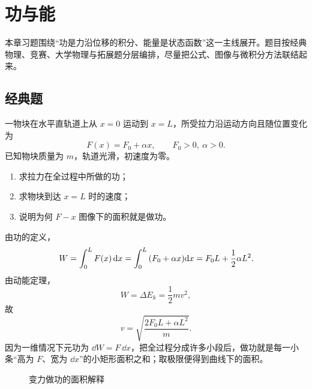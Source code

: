 \chapter{功与能}

本章习题围绕“功是力沿位移的积分、能量是状态函数”这一主线展开。题目按经典物理、竞赛、大学物理与拓展题分层编排，尽量把公式、图像与微积分方法联结起来。

\section{经典题}

\begin{classic}
一物块在水平直轨道上从 $x=0$ 运动到 $x=L$，所受拉力沿运动方向且随位置变化为
\[
F(x)=F_0+\alpha x,\qquad F_0>0,\ \alpha>0.
\]
已知物块质量为 $m$，轨道光滑，初速度为零。
\begin{enumerate}
  \item 求拉力在全过程中所做的功；
  \item 求物块到达 $x=L$ 时的速度；
  \item 说明为何 $F-x$ 图像下的面积就是做功。
\end{enumerate}
\begin{solution}
由功的定义，
\[
W=\int_0^L F(x)\,\dd x=\int_0^L \qty(F_0+\alpha x)\dd x=F_0L+\frac12 \alpha L^2.
\]
由动能定理，
\[
W=\Delta E_k=\frac12 mv^2,
\]
故
\[
v=\sqrt{\frac{2F_0L+\alpha L^2}{m}}.
\]
因为一维情况下元功为 $\dd W=F\,\dd x$，把全过程分成许多小段后，做功就是每一小条“高为 $F$、宽为 $\dd x$”的小矩形面积之和；取极限便得到曲线下的面积。

\begin{figure}[H]
\centering
{}
\caption{变力做功的面积解释}
\end{figure}
\end{solution}
\end{classic}

